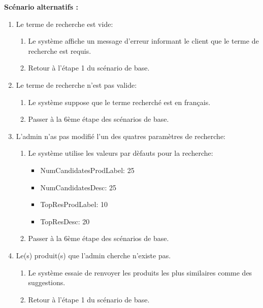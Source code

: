\newpage
\textbf{Scénario alternatifs : }
\begin{enumerate}
	\item Le terme de recherche est vide:
	      \begin{enumerate}
		      \item Le système affiche un message d'erreur informant le client que le terme de recherche est requis.
		      \item Retour à l'étape 1 du scénario de base.
	      \end{enumerate}
	\item Le terme de recherche n'est pas valide:
	      \begin{enumerate}
		      \item Le système suppose que le terme recherché est en français.
		      \item Passer à la 6ème étape des scénarios de base.
	      \end{enumerate}
	\item L'admin n'as pas modifié l'un des quatres paramètres de recherche:
	      \begin{enumerate}
		      \item Le système utilise les valeurs par dèfauts pour la recherche:
		            \begin{itemize}
			            \item NumCandidatesProdLabel: 25
			            \item NumCandidatesDesc: 25
			            \item TopResProdLabel: 10
			            \item TopResDesc: 20
		            \end{itemize}
		      \item Passer à la 6ème étape des scénarios de base.
	      \end{enumerate}
	\item Le(s) produit(s) que l'admin cherche n'existe pas.
	      \begin{enumerate}
		      \item Le système essaie de renvoyer les produits les plus similaires comme des suggestions.
		      \item Retour à l'étape 1 du scénario de base.
	      \end{enumerate}
\end{enumerate}


